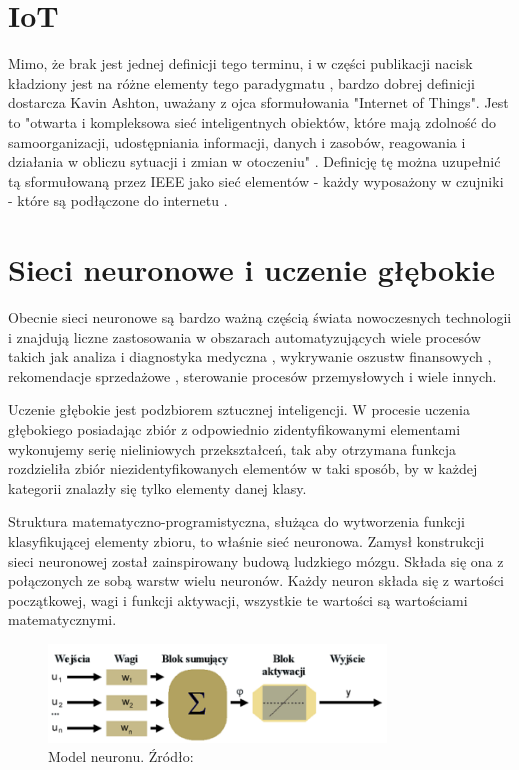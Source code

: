 \documentclass{sprz}
\begin{document}
\section{IoT}

Mimo, że brak jest jednej definicji tego terminu, i w części publikacji nacisk kładziony jest na różne elementy tego paradygmatu \cite{iot-gov}, bardzo dobrej definicji dostarcza Kavin Ashton, uważany z ojca sformułowania "Internet of Things". Jest to "otwarta i kompleksowa sieć inteligentnych obiektów, które mają zdolność do samoorganizacji, udostępniania informacji, danych i zasobów, reagowania i działania w obliczu sytuacji i zmian w otoczeniu" \cite{Ashton2002}. Definicję tę można uzupełnić tą sformułowaną przez IEEE jako sieć elementów - każdy wyposażony w czujniki - które są podłączone do internetu \cite{IEEE-iot}.

\section{Sieci neuronowe i uczenie głębokie}
Obecnie sieci neuronowe są bardzo ważną częścią świata nowoczesnych technologii i znajdują liczne zastosowania w obszarach automatyzujących wiele procesów takich jak analiza i diagnostyka medyczna \cite{diabetes}, wykrywanie oszustw finansowych \cite{laundring}, rekomendacje sprzedażowe \cite{fashion}, sterowanie procesów przemysłowych \cite{irigation} i wiele innych.

Uczenie głębokie jest podzbiorem sztucznej inteligencji. W procesie uczenia głębokiego posiadając zbiór z odpowiednio zidentyfikowanymi elementami wykonujemy serię nieliniowych przekształceń, tak aby otrzymana funkcja rozdzieliła zbiór niezidentyfikowanych elementów w taki sposób, by w każdej kategorii znalazły się tylko elementy danej klasy.

Struktura matematyczno-programistyczna, służąca do wytworzenia funkcji klasyfikującej elementy zbioru, to właśnie sieć neuronowa. Zamysł konstrukcji sieci neuronowej został zainspirowany budową ludzkiego mózgu. Składa się ona z połączonych ze sobą warstw wielu neuronów. Każdy neuron składa się z wartości początkowej, wagi i funkcji aktywacji, wszystkie te wartości są wartościami matematycznymi. 

\begin{figure}[h]
  \centering
  \includegraphics[width=0.8\textwidth]{sprz/neuron}
  \caption{Model neuronu. Źródło: \cite{neuron}}
  \label{img:neuron}
\end{figure} 
\end{document}

